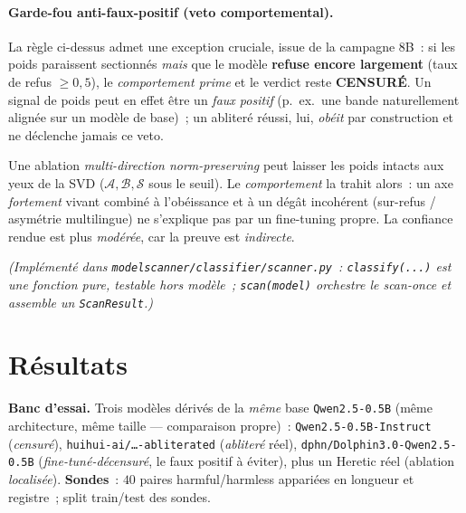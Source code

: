 \documentclass[11pt,a4paper]{article}
\theoremstyle{definition}
\theoremstyle{plain}
\begin{document}
\paragraph{Garde-fou anti-faux-positif (veto comportemental).} La règle ci-dessus
admet une exception cruciale, issue de la campagne $8$B~: si les poids paraissent
sectionnés \emph{mais} que le modèle \textbf{refuse encore largement} (taux de refus
$\ge 0{,}5$), le \emph{comportement prime} et le verdict reste \textbf{CENSURÉ}. Un
signal de poids peut en effet être un \emph{faux positif} (p.~ex.\ une bande
naturellement alignée sur un modèle de base)~; un abliteré réussi, lui, \emph{obéit}
par construction et ne déclenche jamais ce veto.

\begin{intuition}
Une ablation \emph{multi-direction norm-preserving} peut laisser les poids
\og intacts\fg{} aux yeux de la SVD ($\mathcal{A},\mathcal{B},\mathcal{S}$ sous le
seuil). Le \emph{comportement} la trahit alors~: un axe \emph{fortement} vivant
combiné à l'obéissance et à un dégât incohérent (sur-refus / asymétrie multilingue)
ne s'explique pas par un fine-tuning propre. La confiance rendue est plus
\emph{modérée}, car la preuve est \emph{indirecte}.
\end{intuition}

\noindent\emph{(Implémenté dans \texttt{modelscanner/classifier/scanner.py}~:
\texttt{classify(...)} est une fonction pure, testable hors modèle~; \texttt{scan(model)}
orchestre le scan-once et assemble un \texttt{ScanResult}.)}

\section{Résultats}\label{sec:resultats}
\textbf{Banc d'essai.} Trois modèles dérivés de la \emph{même} base
\texttt{Qwen2.5-0.5B} (même architecture, même taille — comparaison propre)~:
\texttt{Qwen2.5-0.5B-Instruct} (\emph{censuré}),
\texttt{huihui-ai/\dots-abliterated} (\emph{abliteré} réel),
\texttt{dphn/Dolphin3.0-Qwen2.5-0.5B} (\emph{fine-tuné-décensuré}, le faux positif à
éviter), plus un Heretic réel (ablation \emph{localisée}). \textbf{Sondes}~: $40$ paires
harmful/harmless appariées en longueur et registre~; split train/test des sondes.
\end{document}
